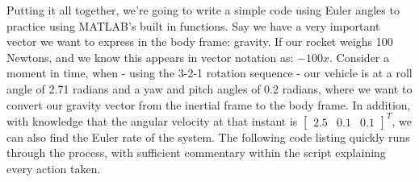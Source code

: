 \documentclass[12pt]{report}
\begin{document}
Putting it all together, we're going to write a simple code using Euler angles to practice using MATLAB's built in functions. Say we have a very important vector we want to express in the body frame: gravity. If our rocket weighs 100 Newtons, and we know this appears in vector notation as: $-100\hat{x}$. Consider a moment in time, when  - using the 3-2-1 rotation sequence - our vehicle is at a roll angle of 2.71 radians and a yaw and pitch angles of 0.2 radians, where we want to convert our gravity vector from the inertial frame to the body frame. In addition, with knowledge that the angular velocity at that instant is $\begin{bmatrix}
    2.5&0.1&0.1
\end{bmatrix}^T$, we can also find the Euler rate of the system. The following code listing quickly runs through the process, with sufficient commentary within the script explaining every action taken.

\lstset{style=mystyle}
\end{document}
